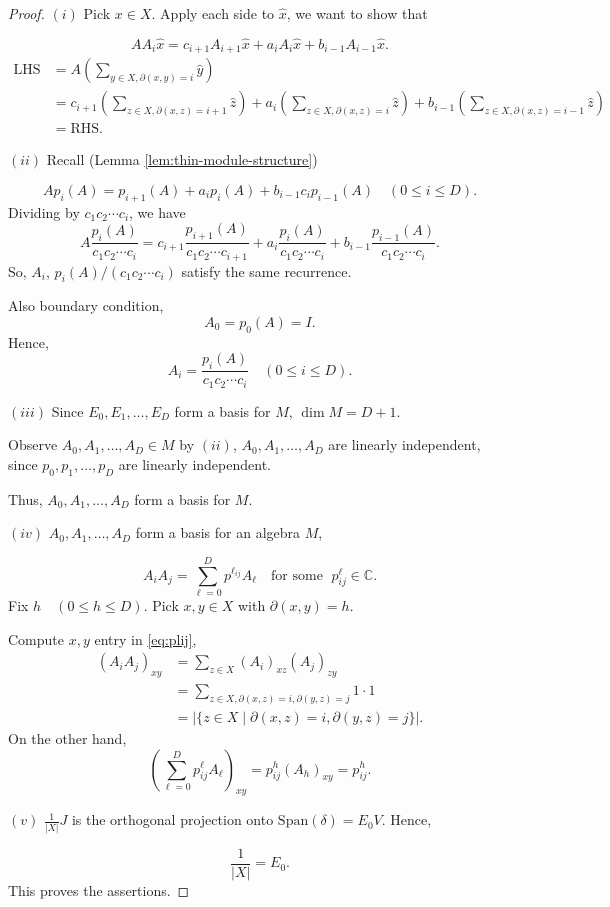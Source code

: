 \documentclass[
]{book}
\theoremstyle{definition}
\theoremstyle{definition}
\theoremstyle{definition}
\theoremstyle{definition}
\theoremstyle{remark}
\begin{document}
\begin{proof}
\leavevmode

\((i)\) Pick \(x\in X\). Apply each side to \(\hat{x}\), we want to show that

\[AA_i \hat{x} = c_{i+1}A_{i+1}\hat{x} + a_iA_i\hat{x} + b_{i-1}A_{i-1}\hat{x}.\]
\begin{align}
\mathrm{LHS} & = A\left(\sum_{y\in X, \partial(x,y) = i}\hat{y}\right)\\
& = c_{i+1}\left(\sum_{z\in X, \partial(x,z) = i+1}\hat{z}\right) + a_i\left(\sum_{z\in X, \partial(x,z) = i}\hat{z}\right) + b_{i-1}\left(\sum_{z\in X, \partial(x,z) = i-1}\hat{z}\right)\\
& = \mathrm{RHS}.
\end{align}

\((ii)\) Recall (Lemma \ref{lem:thin-module-structure})

\[Ap_i(A) = p_{i+1}(A) + a_ip_i(A) + b_{i-1}c_ip_{i-1}(A) \quad (0\leq i\leq D).\]
Dividing by \(c_1c_2\cdots c_i\), we have
\[A\frac{p_i(A)}{c_1c_2\cdots c_i} = c_{i+1}\frac{p_{i+1}(A)}{c_1c_2\cdots c_{i+1}} + a_i\frac{p_i(A)}{c_1c_2\cdots c_i} + b_{i-1}\frac{p_{i-1}(A)}{c_1c_2\cdots c_i}.\]
So, \(A_i\), \(p_i(A)/(c_1c_2\cdots c_i)\) satisfy the same recurrence.

Also boundary condition,
\[A_0 = p_0(A) = I.\]
Hence,
\[A_i = \frac{p_i(A)}{c_1c_2\cdots c_i}\quad (0\leq i\leq D).\]

\((iii)\) Since \(E_0, E_1, \ldots, E_D\) form a basis for \(M\), \(\dim M = D+1\).

Observe \(A_0, A_1, \ldots, A_D\in M\) by \((ii)\),
\(A_0, A_1, \ldots, A_D\) are linearly independent, since \(p_0, p_1, \ldots, p_D\) are linearly independent.

Thus, \(A_0, A_1, \ldots, A_D\) form a basis for \(M\).

\((iv)\) \(A_0, A_1, \ldots, A_D\) form a basis for an algebra \(M\),

\begin{equation}
A_iA_j = \sum_{\ell = 0}^Dp^{\ell_{ij}}A_\ell \quad \text{for some }\; p^\ell_{ij}\in\mathbb{C}. \label{eq:plij}
\end{equation}
Fix \(h \quad (0\leq h\leq D)\). Pick \(x, y\in X\) with \(\partial(x,y) = h\).

Compute \(x, y\) entry in \eqref{eq:plij},
\begin{align}
(A_iA_j)_{xy} & = \sum_{z\in X}(A_i)_{xz}(A_j)_{zy}\\
& = \sum_{z\in X, \partial(x,z)=i, \partial(y,z)=j} 1\cdot 1\\
& = |\{z\in X\mid \partial(x,z)=i, \partial(y,z)=j\}|.
\end{align}
On the other hand,
\[\left(\sum_{\ell=0}^D p^\ell_{ij} A_\ell\right)_{xy} = p^h_{ij}(A_h)_{xy} = p^h_{ij}.\]

\((v)\) \(\frac{1}{|X|}J\) is the orthogonal projection onto \(\mathrm{Span}(\delta) = E_0V\). Hence,

\[\frac{1}{|X|} = E_0.\]
This proves the assertions.

\end{proof}
\end{document}
